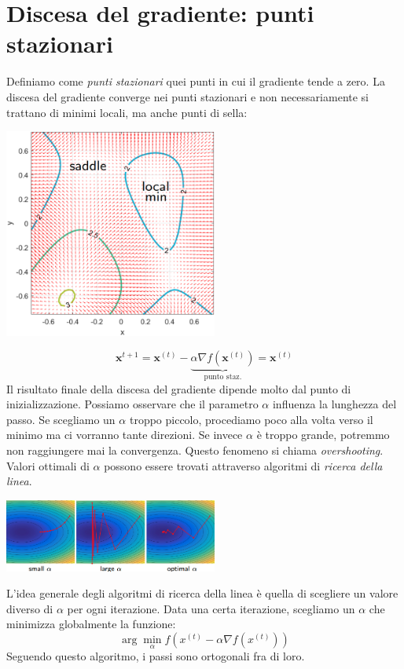 \documentclass{article}
\begin{document}
    \section{Discesa del gradiente: punti stazionari}
        Definiamo come \emph{punti stazionari} quei punti in cui il gradiente tende a zero. La discesa del gradiente 
        converge nei punti stazionari e non necessariamente si trattano di minimi locali, ma anche punti di sella:
        \begin{center}\includegraphics[width=7cm]{stationary_points.png}\end{center}
        \[\mathbf{x}^{t+1} = \mathbf{x}^{(t)} - \underbrace{\alpha \nabla f(\mathbf{x}^{(t)})}_{\text{punto staz.}} = \mathbf{x}^{(t)}\]
        Il risultato finale della discesa del gradiente dipende molto dal punto di inizializzazione. Possiamo osservare che 
        il parametro $\alpha$ influenza la lunghezza del passo. Se scegliamo un 
        $\alpha$ troppo piccolo, procediamo poco alla volta verso il minimo ma ci vorranno tante direzioni. Se invece 
        $\alpha$ è troppo grande, potremmo non raggiungere mai la convergenza. Questo fenomeno si chiama \emph{overshooting}.
        Valori ottimali di $\alpha$ possono essere trovati attraverso algoritmi di \emph{ricerca della linea}.
        \begin{center}\includegraphics[width=7cm]{alpha.png}\end{center}
        L'idea generale degli algoritmi di ricerca della linea è quella di scegliere un valore diverso di $\alpha$ per 
        ogni iterazione. Data una certa iterazione, scegliamo un $\alpha$ che minimizza globalmente la funzione:
        \[\arg \min_\alpha f(x^{(t)} - \alpha \nabla f(x^{(t)})) \]
        Seguendo questo algoritmo, i passi sono ortogonali fra di loro.
\end{document}
